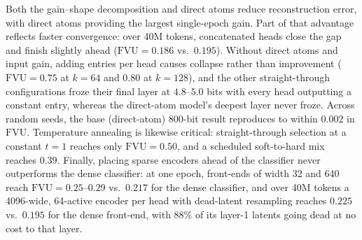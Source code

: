 Both the gain--shape decomposition and direct atoms reduce reconstruction
error, with direct atoms providing the largest single-epoch gain. Part of
that advantage reflects faster convergence: over 40M tokens, concatenated
heads close the gap and finish slightly ahead ($\mathrm{FVU} = 0.186$ vs.\
$0.195$). Without direct atoms and input gain, adding entries per head
causes collapse rather than improvement ($\mathrm{FVU} = 0.75$ at $k{=}64$
and $0.80$ at $k{=}128$), and the other straight-through configurations
froze their final layer at $4.8$--$5.0$ bits with every head outputting a
constant entry, whereas the direct-atom model's deepest layer never froze.
Across random seeds, the base (direct-atom) 800-bit result reproduces to within
$0.002$ in $\mathrm{FVU}$. Temperature annealing is likewise critical:
straight-through selection at a constant $t{=}1$ reaches only
$\mathrm{FVU} = 0.50$, and a scheduled soft-to-hard mix reaches $0.39$.
Finally, placing sparse encoders ahead of the classifier never outperforms
the dense classifier: at one epoch, front-ends of width 32 and 640 reach
$\mathrm{FVU} = 0.25$--$0.29$ vs.\ $0.217$ for the dense classifier, and
over 40M tokens a 4096-wide, 64-active encoder per head with dead-latent
resampling reaches $0.225$ vs.\ $0.195$ for the dense front-end, with 88\%
of its layer-1 latents going dead at no cost to that layer.

